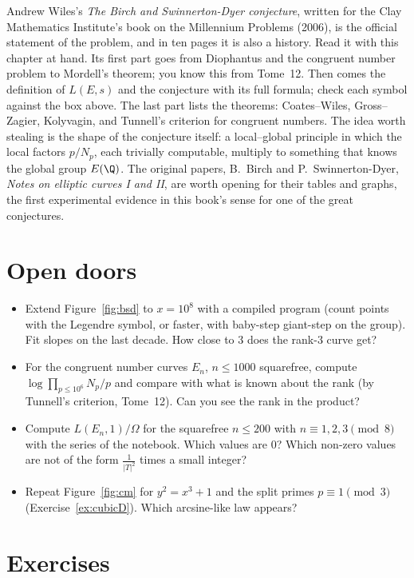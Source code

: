 Andrew Wiles's \emph{The Birch and Swinnerton-Dyer conjecture}, written for the Clay Mathematics Institute's book on the Millennium Problems (2006), is the
official statement of the problem, and in ten pages it is also a history. Read it with this chapter at hand. Its first part goes from Diophantus and the
congruent number problem to Mordell's theorem; you know this from Tome~12. Then comes the definition of $L(E,s)$ and the conjecture with its full formula; check
each symbol against the box above. The last part lists the theorems: Coates--Wiles, Gross--Zagier, Kolyvagin, and Tunnell's criterion for congruent numbers.
The idea worth stealing is the shape of the conjecture itself: a local--global principle in which the local factors $p/N_p$, each trivially computable,
multiply to something that knows the global group $E(\Q)$. The original papers, B.~Birch and P.~Swinnerton-Dyer, \emph{Notes on elliptic curves I and II},
are worth opening for their tables and graphs, the first experimental evidence in this book's sense for one of the great conjectures.

\section{Open doors}

\begin{itemize}
\item Extend Figure~\ref{fig:bsd} to $x=10^8$ with a compiled program (count points with the Legendre symbol, or faster, with baby-step giant-step on the
group). Fit slopes on the last decade. How close to $3$ does the rank-$3$ curve get?
\item For the congruent number curves $E_n$, $n\le1000$ squarefree, compute $\log\prod_{p\le10^6}N_p/p$ and compare with what is known about the rank (by
Tunnell's criterion, Tome~12). Can you see the rank in the product?
\item Compute $L(E_n,1)/\Omega$ for the squarefree $n\le200$ with $n\equiv1,2,3\pmod8$ with the series of the notebook. Which values are $0$? Which non-zero values
are not of the form $\frac1{|T|^2}$ times a small integer?
\item Repeat Figure~\ref{fig:cm} for $y^2=x^3+1$ and the split primes $p\equiv1\pmod3$ (Exercise~\ref{ex:cubicD}). Which arcsine-like law appears?
\end{itemize}

\section{Exercises}

